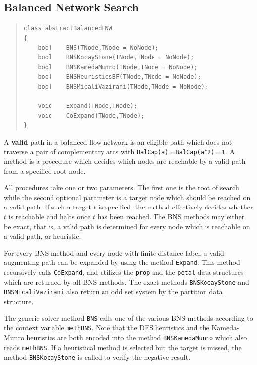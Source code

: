 \documentclass[a4paper,11pt,twoside]{book}
\begin{document}
\begin{multicols}{2}
\section{Balanced Network Search}
\label{slb_bns}
\methods
\begin{quote}
\begin{verbatim}
class abstractBalancedFNW
{
    bool    BNS(TNode,TNode = NoNode);
    bool    BNSKocayStone(TNode,TNode = NoNode);
    bool    BNSKamedaMunro(TNode,TNode = NoNode);
    bool    BNSHeuristicsBF(TNode,TNode = NoNode);
    bool    BNSMicaliVazirani(TNode,TNode = NoNode);

    void    Expand(TNode,TNode);
    void    CoExpand(TNode,TNode);
}
\end{verbatim}
\end{quote}
A {\bf valid} path in a balanced flow network is an eligible
path which does not traverse a pair of complementary arcs with
\verb/BalCap(a)==BalCap(a^2)==1/. A  method
is a procedure which decides which nodes are reachable by a valid path from a
specified root node.

All procedures take one or two parameters. The first one is the root of search
while the second optional parameter is a target node which should be reached on
a valid path. If such a target $t$ is specified, the method effectively decides
whether $t$ is reachable and halts once $t$ has been reached. The BNS methods
may either be exact, that is, a valid path is determined for every node which
is reachable on a valid path, or heuristic.

For every BNS method and every node with finite distance label, a valid
augmenting path can be expanded by using the method \verb/Expand/. This method
recursively calls \verb/CoExpand/, and utilizes the \verb/prop/ and the
\verb/petal/ data structures which are returned by all BNS methods. The exact
methods \verb/BNSKocayStone/ and \verb/BNSMicaliVazirani/ also return an
odd set system by the partition data structure.

The generic solver method \verb/BNS/ calls one of the various BNS methods
according to the context variable \verb/methBNS/. Note that the DFS heuristics
and the Kameda-Munro heuristics are both encoded into the method
\verb/BNSKamedaMunro/ which also reads \verb/methBNS/. If a heuristical method
is selected but the target is missed, the method \verb/BNSKocayStone/
is called to verify the negative result.



\end{multicols}
\end{document}
